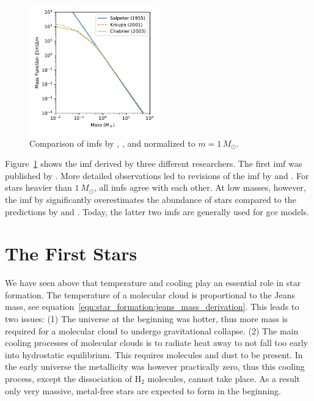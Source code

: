 \begin{figure}[tb]
    \centering
    \includegraphics[width=0.5\textwidth]{graphics/star_formation/imf}
    \caption{Comparison of \acp{imf} by \citet{salpeter55}, \citet{kroupa01}, and \citet{chabrier03} normalized to $m=1\,M_\odot$.}
    \label{fig:star_formation:imf}
\end{figure}
Figure~\ref{fig:star_formation:imf} shows the \ac{imf} derived by three different researchers. The first \ac{imf} was published by \citet{salpeter55}. More detailed observations led to revisions of the \ac{imf} by \citet{kroupa01} and \citet{chabrier03}. 
For stars heavier than $1\,M_\odot$, all \acp{imf} agree with each other. At low masses, however, the \ac{imf} by \citet{salpeter55} significantly overestimates the abundance of stars compared to the predictions by \citet{kroupa01} and \citet{chabrier03}. Today, the latter two \acp{imf} are generally used for \ac{gce} models.


\section{The First Stars}

We have seen above that temperature and cooling play an essential role in star formation. The temperature of a molecular cloud is proportional to the Jeans mass, see equation~\eqref{eqn:star_formation:jeans_mass_derivation}. This leads to two issues: (1) The universe at the beginning was hotter, thus more mass is required for a molecular cloud to undergo gravitational collapse. (2) The main cooling processes of molecular clouds is to radiate heat away to not fall too early into hydrostatic equilibrium. This requires molecules and dust to be present. In the early universe the metallicity was however practically zero, thus this cooling process, except the dissociation of H$_2$ molecules, cannot take place. As a result only very massive, metal-free stars are expected to form in the beginning. 

